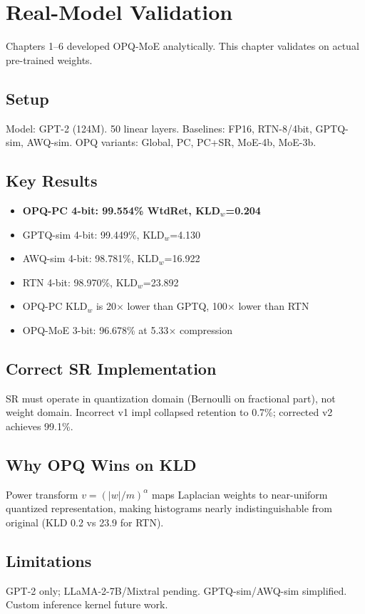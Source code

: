 \section{Real-Model Validation}
Chapters 1--6 developed OPQ-MoE analytically. This chapter validates on
actual pre-trained weights.

\subsection{Setup}
Model: GPT-2 (124M). 50 linear layers. Baselines: FP16, RTN-8/4bit,
GPTQ-sim, AWQ-sim. OPQ variants: Global, PC, PC+SR, MoE-4b, MoE-3b.

\subsection{Key Results}
\begin{itemize}
\item \textbf{OPQ-PC 4-bit: 99.554\% WtdRet, KLD$_w$=0.204}
\item GPTQ-sim 4-bit: 99.449\%, KLD$_w$=4.130
\item AWQ-sim 4-bit: 98.781\%, KLD$_w$=16.922
\item RTN 4-bit: 98.970\%, KLD$_w$=23.892
\item OPQ-PC KLD$_w$ is 20$\times$ lower than GPTQ, 100$\times$ lower than RTN
\item OPQ-MoE 3-bit: 96.678\% at 5.33$\times$ compression
\end{itemize}

\subsection{Correct SR Implementation}
SR must operate in quantization domain (Bernoulli on fractional part),
not weight domain. Incorrect v1 impl collapsed retention to 0.7\%;
corrected v2 achieves 99.1\%.

\subsection{Why OPQ Wins on KLD}
Power transform $v=(|w|/m)^\alpha$ maps Laplacian weights to near-uniform
quantized representation, making histograms nearly indistinguishable
from original (KLD 0.2 vs 23.9 for RTN).

\subsection{Limitations}
GPT-2 only; LLaMA-2-7B/Mixtral pending. GPTQ-sim/AWQ-sim simplified.
Custom inference kernel future work.
